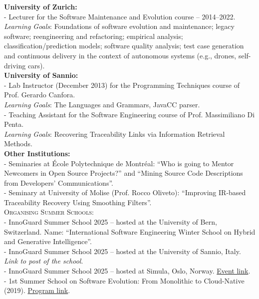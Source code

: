 \documentclass[11pt]{article}
\begin{document}
\textbf{University of Zurich:}
\medskip \\
- Lecturer for the Software Maintenance and Evolution course – 2014–2022. \\
  \textit{Learning Goals}: Foundations of software evolution and maintenance; legacy software; reengineering and refactoring; empirical analysis; classification/prediction models; software quality analysis; test case generation and continuous delivery in the context of autonomous systems (e.g., drones, self-driving cars).\\

\textbf{University of Sannio:}
\medskip \\
- Lab Instructor (December 2013) for the Programming Techniques course of Prof. Gerardo Canfora.\\
  \textit{Learning Goals}: The Languages and Grammars, JavaCC parser.\\
- Teaching Assistant for the Software Engineering course of Prof. Massimiliano Di Penta.\\
  \textit{Learning Goals}: Recovering Traceability Links via Information Retrieval Methods.\\


\textbf{Other Institutions:}
\medskip \\
- Seminaries at École Polytechnique de Montréal: 
  ``Who is going to Mentor Newcomers in Open Source Projects?'' and 
  ``Mining Source Code Descriptions from Developers’ Communications''.\\
- Seminary at University of Molise (Prof. Rocco Oliveto): 
  ``Improving IR-based Traceability Recovery Using Smoothing Filters''.\\


\textsc{Organising Summer Schools:}
\medskip \\
- InnoGuard Summer School 2025 – hosted at the University of Bern, Switzerland. Name: ``International Software Engineering Winter School on Hybrid and Generative Intelligence''.\\
- InnoGuard Summer School 2025 – hosted at the University of Sannio, Italy. \textit{Link to post of the school}.\\
- InnoGuard Summer School 2025 – hosted at Simula, Oslo, Norway. \href{https://www.simula.no/about/news/next-generation-innovators-inside-2025-innoguard-summer-school}{Event link}.\\
- 1st Summer School on Software Evolution: From Monolithic to Cloud-Native (2019). \href{https://inforte.jyu.fi/events/SW_evolution}{Program link}.\\
\end{document}
